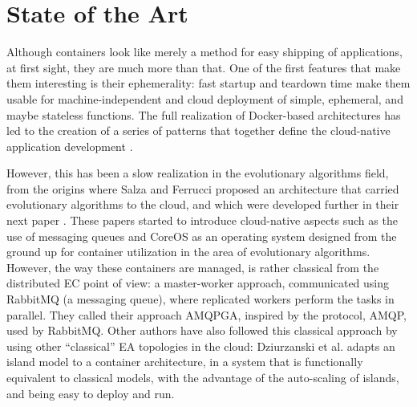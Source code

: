 \documentclass[review]{elsarticle}
\begin{document}
\section{State of the Art} 
\label{soa}

Although containers look like merely a method for easy shipping 
of applications, at first sight, they are much more than
that. One of the first features that make them interesting is their
ephemerality: fast startup and teardown time make them usable for
machine-independent and cloud deployment of simple, ephemeral, and
maybe stateless functions. 
The full realization
of Docker-based architectures has led to the creation of a series of
patterns that together define the cloud-native application development
\cite{kratzke2017understanding}.

However, this has been a slow realization in the evolutionary algorithms 
field, from the origins where Salza and Ferrucci \cite{salza2016approach,salza2016develop} 
proposed an architecture that carried evolutionary algorithms to the cloud, 
and which were developed further in their next paper \cite{de2017parallel}.
These papers started to introduce cloud-native
aspects such as the use of messaging queues and CoreOS as an operating system
designed from the ground up for container utilization in the area of
evolutionary algorithms. However, the way these containers are managed, is
rather classical from the distributed EC point of view: a
master-worker approach, communicated using RabbitMQ (a messaging queue), where
replicated workers perform the tasks in parallel. They called their approach
AMQPGA, inspired by the protocol, AMQP, used by RabbitMQ.
Other authors have also followed this classical approach by using other 
``classical'' EA topologies in the cloud: Dziurzanski et al.
\cite{dziurzanski2020scalable} adapts an island model to a container
architecture, in a system that is functionally equivalent to classical models,
with the advantage of the auto-scaling of islands, and being easy to deploy and
run.
\end{document}
